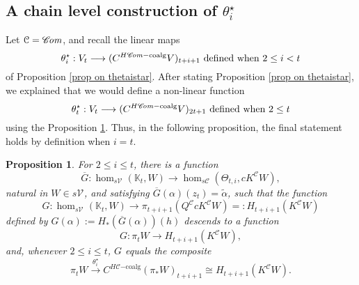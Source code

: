 \documentclass[11pt]{amsart} \renewcommand{\baselinestretch}{1.2}
\theoremstyle{plain}
\newtheorem{prop}[thm]{Proposition}
\numberwithin{equation}{section} %
\theoremstyle{plain}
\newtheorem{prop}[thm]{Proposition}
\numberwithin{equation}{chapter} %
\renewcommand{\to}{\longrightarrow}
\newcommand{\scrC}{\mathscr{C}}
\newcommand{\calV}{\mathcal{V}}
\newcommand{\calc}{\mathcal{C}}
\newcommand{\vect}[2]{\calV^{#1}_{#2}}
\newcommand{\HC}[1]{H#1\mathrm{-coalg}}
\newcommand{\epi}{{\,\makebox[0cm][l]{\ensuremath\to}\to{}}}
\newcommand{\algs}{{\scrC\!\textit{\normalfont\textit{om}}}}
\newcommand{\SubsectionOrSection}[1]{\subsection{#1}}
\begin{document}
\begin{Operations on the Bousfield-Kan spectral sequence}
\SubsectionOrSection{A chain level construction of $\theta^\star_i$}
Let $\calc=\algs$, and recall the linear maps 
\[\theta_i^\star:V_t\to (C^{\HC{\algs}}V)_{t+i+1}\textup{ defined when }2\leq i<t\]
of Proposition \ref{prop on thetaistar}. After stating Proposition \ref{prop on thetaistar}, we explained that we would define a non-linear function
\[\theta_t^\star : V_t\to (C^{\HC{\algs}}V)_{2t+1}\textup{ defined when }2\leq t\]
using the Proposition \ref{propOnKoszulDelta}. Thus, in the following proposition, the final statement holds by definition when $i=t$.
\begin{prop}
\label{propOnKoszulDelta}
For $2\leq i\leq t$, there is a function
\[\overline{G}:\hom_{s\vect{}{}}(\mathbb{K}_t,W)\to \hom_{s\calc}(\Theta_{t,i},cK^{\calc}W),\]
natural in $W\in s\vect{}{}$, and satisfying $\overline{G}(\alpha)( z_t)=\widetilde{\alpha}$, such that the function
\[G:\hom_{s\vect{}{}}(\mathbb{K}_t,W)\to \pi_{t+i+1}(Q^{\calc}cK^{\calc}W)=:H_{t+i+1}(K^{\calc}W)\]%
defined by $G(\alpha):=H_*(\overline{G}(\alpha))(h)$ descends to a function
\[G:\pi_tW\to H_{t+i+1}(K^\calc W),\]
and, whenever $2\leq i\leq t$, $G$ equals the composite
\[\pi_t W \overset{\theta_i^\star}{\to}C^{\HC{\calc}}(\pi_*W)_{t+i+1}\cong H_{t+i+1}(K^{\calc}W).\]



\end{prop}
\end{Operations on the Bousfield-Kan spectral sequence}
\end{document}
